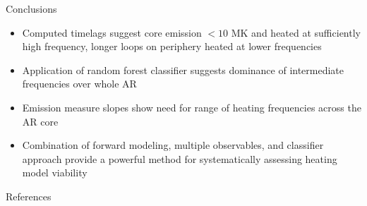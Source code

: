 \documentclass[final,12pt]{beamer}
\begin{document}
\begin{frame}
\begin{columns}[T]
\begin{column}{0.49\linewidth}
\begin{block}{Conclusions}
\begin{itemize}
        \item Computed timelags suggest \alert{core emission $<10$ MK and heated at sufficiently high frequency}, longer loops on periphery heated at lower frequencies
        \item Application of random forest classifier suggests \alert{dominance of intermediate frequencies over whole AR}
        \item Emission measure slopes show need for \alert{range of heating frequencies} across the AR core
        \item Combination of forward modeling, multiple observables, and classifier approach provide a \alert{powerful method for systematically assessing heating model viability}
      \end{itemize}
    \end{block}
    \begin{block}{References}
      \scriptsize
      \begin{multicols}{2}
        
        
      \end{multicols}
    \end{block}
  \end{column}
  \end{columns}
\end{frame}
\end{document}
